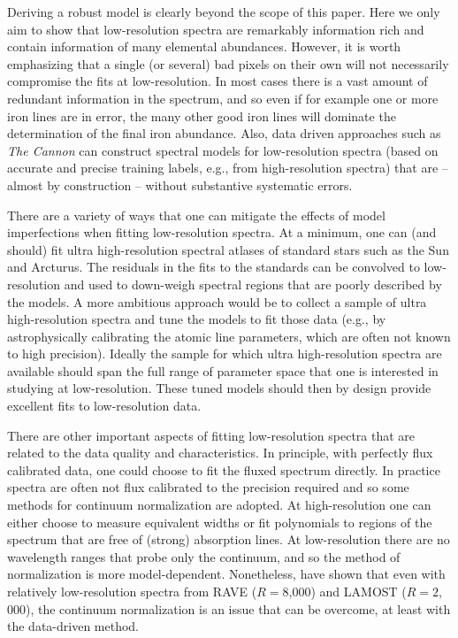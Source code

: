 \documentclass[iop]{emulateapj}
\begin{document}
\begin{CJK*}{UTF8}{gbsn}
Deriving a robust model is clearly beyond the scope of this paper. Here we only aim to show that low-resolution spectra are remarkably information rich and contain information of many elemental abundances. However, it is worth emphasizing that a single (or several) bad pixels on their own will not necessarily compromise the fits at low-resolution. In most cases there is a vast amount of redundant information in the spectrum, and so even if for example one or more iron lines are in error, the many other good iron lines will dominate the determination of the final iron abundance. Also, data driven approaches such as {\it The Cannon} \citep{nes15a} can construct spectral models for low-resolution spectra (based on accurate and precise training labels, e.g., from high-resolution spectra) that are -- almost by construction -- without substantive systematic errors.

There are a variety of ways that one can mitigate the effects of model imperfections when fitting low-resolution spectra. At a minimum, one can (and should) fit ultra high-resolution spectral atlases of standard stars such as the Sun and Arcturus. The residuals in the fits to the standards can be convolved to low-resolution and used to down-weigh spectral regions that are poorly described by the models. A more ambitious approach would be to collect a sample of ultra high-resolution spectra and tune the models to fit those data (e.g., by astrophysically calibrating the atomic line parameters, which are often not known to high precision). Ideally the sample for which ultra high-resolution spectra are available should span the full range of parameter space that one is interested in studying at low-resolution. These tuned models should then by design provide excellent fits to low-resolution data.

There are other important aspects of fitting low-resolution spectra that are related to the data quality and characteristics. In principle, with perfectly flux calibrated data, one could choose to fit the fluxed spectrum directly. In practice spectra are often not flux calibrated to the precision required and so some methods for continuum normalization are adopted. At high-resolution one can either choose to measure equivalent widths or fit polynomials to regions of the spectrum that are free of (strong) absorption lines. At low-resolution there are no wavelength ranges that probe only the continuum, and so the method of normalization is more model-dependent. Nonetheless, \citet{cas16,ho16,ho17} have shown that even with relatively low-resolution spectra from RAVE ($R=8$,$000$) and LAMOST ($R=2$,$000$), the continuum normalization is an issue that can be overcome, at least with the data-driven method.


\end{CJK*}
\end{document}
